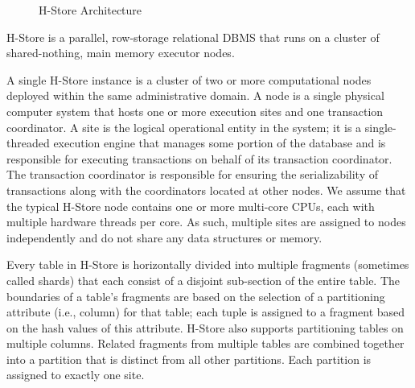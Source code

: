 \documentclass[9pt,twocolumn,twoside]{styles/osajnl}
\begin{document}
\begin{figure}[htbp]
\centering
{}
\caption{H-Store Architecture}
\label{fig:false-color}
\end{figure}

H-Store is a parallel, row-storage relational DBMS that runs on a cluster of shared-nothing, main memory executor nodes.

A single H-Store instance is a cluster of two or more computational nodes deployed within the same administrative domain. A node is a single physical computer system that hosts one or more execution sites and one transaction coordinator. A site is the logical operational entity in the system; it is a single-threaded execution engine that manages some portion of the database and is responsible for executing transactions on behalf of its transaction coordinator. The transaction coordinator is responsible for ensuring the serializability of transactions along with the coordinators located at other nodes. We assume that the typical H-Store node contains one or more multi-core CPUs, each with multiple hardware threads per core. As such, multiple sites are assigned to nodes independently and do not share any data structures or memory.

Every table in H-Store is horizontally divided into multiple fragments (sometimes called shards) that each consist of a disjoint sub-section of the entire table. The boundaries of a table’s fragments are based on the selection of a partitioning attribute (i.e., column) for that table; each tuple is assigned to a fragment based on the hash values of this attribute. H-Store also supports partitioning tables on multiple columns. Related fragments from multiple tables are combined together into a partition that is distinct from all other partitions. Each partition is assigned to exactly one site.
\end{document}
